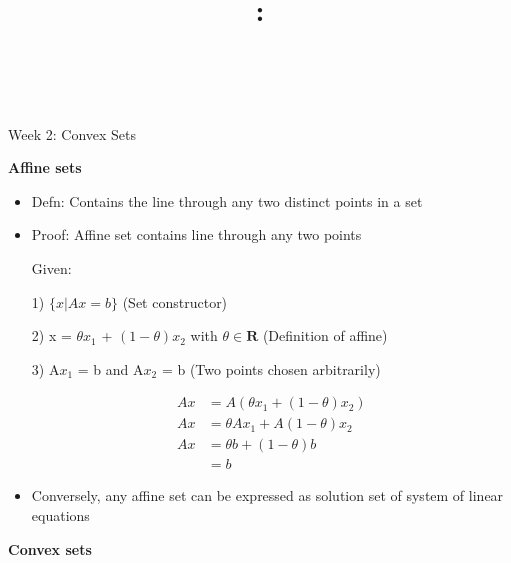 \documentclass{article}
\title{
\vspace{2in}
\textmd{\textbf{\hmwkClass:}\\
\textmd{\hmwkTitle}}\\
\vspace{3in}
}
\author{\textbf{\hmwkAuthorName}}
\begin{document}
\maketitle



\newpage
\begin{homeworkProblemName}{{\LARGE Week 2: Convex Sets}}

  \vspace{0.2 cm} \textbf{{\large Affine sets}}

  \begin{problemAnswer}{
      \begin{itemize}
      \item Defn: Contains the line through any two distinct points in
        a set

      \item Proof: Affine set contains line through any two points

        Given:

        1) $\{x | Ax = b\}$ (Set constructor)

        2) x = $\theta x_1$ + $(1 - \theta)x_2$ with $\theta \in \bm{R}$  (Definition of affine)

        3) A$x_1$ = b and A$x_2$ = b (Two points chosen arbitrarily)

        \begin{align*}
          Ax &= A(\theta x_1 + (1 - \theta)x_2) \tag{Fact 2}\\
          Ax &= \theta Ax_1 + A(1 - \theta)x_2\\
          Ax &= \theta b + (1 - \theta) b \tag{Fact 3}\\
             &= b
        \end{align*}

      \item Conversely, any affine set can be expressed as solution set of system of linear
        equations
      \end{itemize}
    }\end{problemAnswer}


  \vspace{0.2 cm} \textbf{{\large Convex sets}}

  \begin{problemAnswer}{

}
\end{problemAnswer}
\end{homeworkProblemName}
\end{document}
